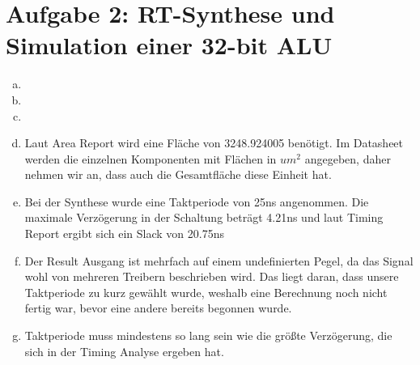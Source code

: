 \documentclass[a4paper]{scrartcl}
\begin{document}
	\section*{Aufgabe 2: RT-Synthese und Simulation einer 32-bit ALU}
	
	\begin{enumerate}[(a)]
		\item 
		\item 
		\item 
		\item Laut Area Report wird eine Fläche von 3248.924005 benötigt. Im Datasheet werden die einzelnen Komponenten mit Flächen in $um^2$ angegeben, daher nehmen wir an, dass auch die Gesamtfläche diese Einheit hat.
		
		\item Bei der Synthese wurde eine Taktperiode von 25ns angenommen. Die maximale Verzögerung in der Schaltung beträgt 4.21ns und laut Timing Report ergibt sich ein Slack von 20.75ns
		\item Der Result Ausgang ist mehrfach auf einem undefinierten Pegel, da das Signal wohl von mehreren Treibern beschrieben wird. Das liegt daran, dass unsere Taktperiode zu kurz gewählt wurde, weshalb eine Berechnung noch nicht fertig war, bevor eine andere bereits begonnen wurde.
		\item Taktperiode muss mindestens so lang sein wie die größte Verzögerung, die sich in der Timing Analyse ergeben hat.
	\end{enumerate}

	
\end{document}
